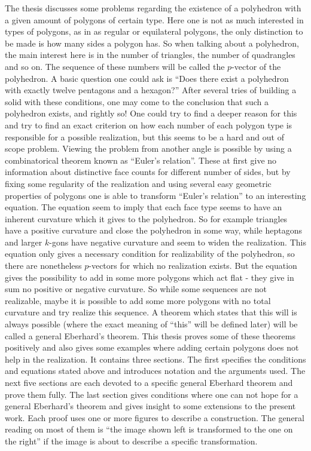 The thesis discusses some problems regarding the existence of a polyhedron with a given amount of polygons of certain type. Here one is not as much interested in types of polygons, as in as regular or equilateral polygons, the only distinction to be made is how many sides a polygon has. So when talking about a polyhedron, the main interest here is in the number of triangles, the number of quadrangles and so on. The sequence of these numbers will be called the $p$-vector of the polyhedron. A basic question one could ask is ``Does there exist a polyhedron with exactly twelve pentagons and a hexagon?'' After several tries of building a solid with these conditions, one may come to the conclusion that such a polyhedron exists, and rightly so! One could try to find a deeper reason for this and try to find an exact criterion on how each number of each polygon type is responsible for a possible realization, but this seems to be a hard and out of scope problem. Viewing the problem from another angle is possible by using a combinatorical theorem known as ``Euler's relation''. These at first give no information about distinctive face counts for different number of sides, but by fixing some regularity of the realization and using several easy geometric properties of polygons one is able to transform ``Euler's relation'' to an interesting equation. The equation seem to imply that each face type seems to have an inherent curvature which it gives to the polyhedron. So for example triangles have a positive curvature and close the polyhedron in some way, while heptagons and larger $k$-gons have negative curvature and seem to widen the realization. This equation only gives a necessary condition for realizability of the polyhedron, so there are nonetheless $p$-vectors for which no realization exists. But the equation gives the possibility to add in some more polygons which act flat - they give in sum no positive or negative curvature. So while some sequences are not realizable, maybe it is possible to add some more polygons with no total curvature and try realize this sequence. A theorem which states that this will is always possible (where the exact meaning of ``this'' will be defined later) will be called a general Eberhard's theorem. This thesis proves some of these theorems positively and also gives some examples where adding certain polygons does not help in the realization. It contains three sections. The first specifies the conditions and equations stated above and introduces notation and the arguments used. The next five sections are each devoted to a specific general Eberhard theorem and prove them fully. The last section gives conditions where one can not hope for a general Eberhard's theorem and gives insight to some extensions to the present work. Each proof uses one or more figures to describe a construction. The general reading on most of them is ``the image shown left is transformed to the one on the right'' if the image is about to describe a specific transformation.
